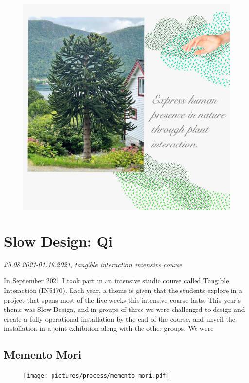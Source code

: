 \begin{figure}[H]
\includegraphics[width=13cm]{pictures/human_presence.jpg}
\centering 
\end{figure}


\section{Slow Design: Qi}
\par
\emph{25.08.2021-01.10.2021, tangible interaction intensive course}
\par

In September 2021 I took part in an intensive studio course called Tangible Interaction (IN5470). Each year, a theme is given that the students explore in a project that spans most of the five weeks this intensive course lasts. This year's theme was Slow Design, and in groups of three we were challenged to design and create a fully operational installation by the end of the course, and unveil the installation in a joint exhibition along with the other groups. We were 


\subsection{Memento Mori}

\begin{figure}[H]
\texttt{[image: pictures/process/memento\_mori.pdf]}
\caption{}
\centering 
\end{figure}

